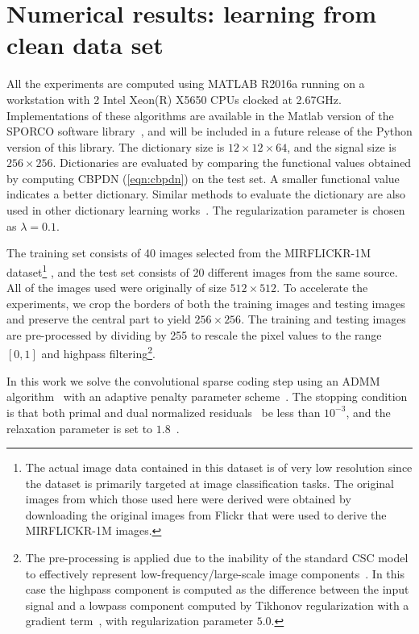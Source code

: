 \documentclass[final]{siamart1116}
\begin{document}
\section{Numerical results: learning from clean data set}
\label{sec:rslt}

All the experiments are computed using MATLAB R2016a running on a workstation with 2 Intel Xeon(R) X5650 CPUs clocked at 2.67GHz. Implementations of these algorithms are available in the Matlab version of the SPORCO software library~\cite{wohlberg-2016-sporco}, and will be included in a future release of the Python version of this library. The dictionary size is $12 \times 12 \times 64$, and the signal size is $256 \times 256$. Dictionaries are evaluated by comparing the functional values obtained by computing CBPDN (\ref{eqn:cbpdn}) on the test set. A smaller functional value indicates a better dictionary. Similar methods to evaluate the dictionary are also used in other dictionary learning works~\cite{mairal-2010-online, tang2012self}.   The regularization parameter is chosen as $\lambda=0.1$.

The training set consists of 40 images selected from the MIRFLICKR-1M dataset\footnote{The actual image data contained in this dataset is of very low resolution since the dataset is primarily targeted at image classification tasks. The original images from which those used here were derived were obtained by downloading the original images from Flickr that were used to derive the MIRFLICKR-1M images.} \cite{huiskes-2008-new}, and the test set consists of 20 different images from the same source.
All of the images used were originally of size $512\times512$. To accelerate the experiments, we crop the borders of both the training images and testing images and preserve the central part to yield $256\times256$. The training and testing images are pre-processed by dividing by 255 to rescale the pixel values to the range $[0, 1]$ and highpass filtering\footnote{The pre-processing is applied due to the inability of the standard CSC model to effectively represent low-frequency/large-scale image components~\cite[Sec. 3]{wohlberg-2016-convolutional2}. In this case the highpass component is computed as the difference between the input signal and a lowpass component computed by Tikhonov regularization with a gradient term~\cite[pg. 3]{wohlberg-2017-sporco}, with regularization parameter $5.0$. }.

In this work we solve the convolutional sparse coding step using an ADMM algorithm~\cite{wohlberg-2014-efficient} with an adaptive penalty parameter scheme~\cite{wohlberg2017admm}. The stopping condition is that both primal and dual normalized residuals~\cite{wohlberg2017admm} be less than $10^{-3}$, and the relaxation parameter is set to $1.8$~\cite{wohlberg-2016-efficient}.
\end{document}
